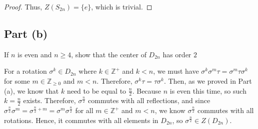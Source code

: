 \begin{answer}
\begin{proof}
        Thus, $Z(S_{2n}) = \{e\}$, which is trivial.
    \end{proof}
\end{answer}

\subsection{Part (b)}

\begin{question}
    If $n$ is even and $n \geq 4$, show that the center of $D_{2n}$ has order $2$
\end{question}

\begin{answer}
    For a rotation $\sigma^k \in D_{2n}$ where $k \in \mathbb{Z}^+$ and $k < n$, we must have $\sigma^k \sigma^m\tau = \sigma^m\tau\sigma^k$ for some $m \in \mathbb{Z}_{\geq 0}$ and $m < n$. Therefore, $\sigma^k\tau = \tau\sigma^k$. Then, as we proved in Part (a), we know that $k$ need to be equal to $\tfrac{n}{2}$. Because $n$ is even this time, so such $k = \tfrac{n}{2}$ exists. Therefore, $\sigma^{\tfrac{n}{2}}$ commutes with all reflections, and since $\sigma^{\tfrac{n}{2}}\sigma^m = \sigma^{\tfrac{n}{2}+m} = \sigma^m\sigma^{\tfrac{n}{2}}$ for all $m \in \mathbb{Z}^+$ and $m < n$, we know $\sigma^{\tfrac{n}{2}}$ commutes with all rotations. Hence, it commutes with all elements in $D_{2n}$, so $\sigma^{\tfrac{n}{2}} \in Z(D_{2n})$.
    

\end{answer}
